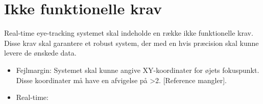 \documentclass[kravspec.tex]{subfiles}
\begin{document}
	
\section{Ikke funktionelle krav}
Real-time eye-tracking systemet skal indeholde en række ikke funktionelle krav. Disse krav skal garantere et robust system, der med en hvis præcision skal kunne levere de ønskede data.\\
\begin{itemize}
	\item 
	Fejlmargin: Systemet skal kunne angive XY-koordinater for øjets fokuspunkt. Disse koordinater må have en afvigelse på >2\degree. [Reference mangler].
	\item 
	Real-time: 
\end{itemize}
\end{document}
